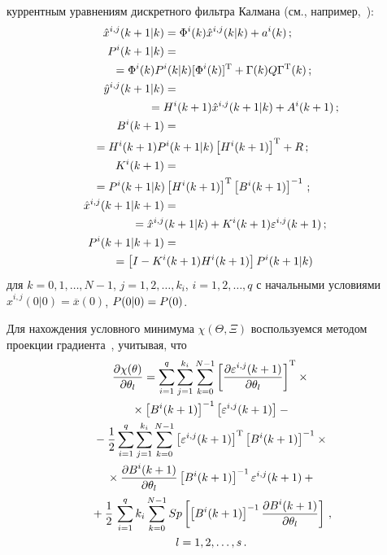 \begin{multicols}{2}
\noindent
куррентным уравнениям дискретного фильтра Калмана (см.,
например,~\cite{16-c}):
\begin{align}
\hat{x}^{i,j}(k+1\vert k) &=\Phi^i(k) \hat{x}^{i,j}(k\vert k)+a^i(k)\,;\notag\\
P^i (k+1\vert k)&={}\notag\\
&\hspace*{-16mm}{}=\Phi^i (k) P^i (k\vert k)[\Phi^i (k) ]^{\mathrm{T}}+
\Gamma(k) Q \Gamma^{\mathrm{T}}(k)\,;\label{e12-c}\\
\hat{y}^{i,j}(k+1\vert k) &={}\notag\\
&\hspace*{-5mm}{}=H^i(k+1) \hat{x}^{i,j}(k+1\vert k)+A^i(k+1)\,;\notag\\
B^i(k+1) &={}\notag\\
&\hspace*{-22mm}{}=H^i(k+1)P^i(k+1\vert k)\left[H^i(k+1)\right]^{\mathrm{T}}+R\,;\label{e13-c}\\
K^i(k+1) & ={}\notag\\
&\hspace*{-22mm}{}= P^i(k+1\vert k) \left[ H^i(k+1)\right]^{\mathrm{T}}\left[B^i(k+1)\right]^{-1}\,;\label{e14-c}\\
\hat{x}^{i,j}(k+1\vert k+1) & ={}\notag\\
&\hspace*{-10mm}{}=\hat{x}^{i,j}(k+1\vert  k)+K^i(k+1)\varepsilon^{i,j}(k+1)\,;\notag\\
P^i(k+1 \vert k+1) &={}\notag\\
&\hspace*{-16mm}{}=\left[ I-K^i(k+1)H^i(k+1)\right] P^i(k+1\vert k)\label{e15-c}
\end{align}
для $k=0, 1, \ldots , N-1$, $j=1, 2, \ldots , k_i$, $i=1, 2, \ldots , q$ с начальными
условиями $\hat{x}^{i,j}(0\vert 0)=\overline{x}(0)$, $P(0\vert 0)\hm=P(0)$.

  Для нахождения условного минимума $\chi(\Theta, \Xi)$ воспользуемся
методом проекции градиента~\cite{17-c, 18-c}, учитывая, что
  \begin{multline*}
  \displaystyle\frac{\displaystyle \partial \chi(\theta)\mathstrut}{\displaystyle \partial \theta_l\mathstrut} = \sum\limits_{i=1}^q
\sum\limits_{j=1}^{k_i}\sum\limits_{k=0}^{N-1} \left[ \displaystyle\frac{\displaystyle \partial
\varepsilon^{i,j}(k+1)\mathstrut}{\displaystyle \partial\theta_l\mathstrut}\right]^{\mathrm{T}} \times{}\\
{}\times \left[ B^i(k+1)\right ]^{-
1}\left[\varepsilon^{i,j}(k+1)\right]-{}\\
  {}- \displaystyle\frac{\displaystyle 1\mathstrut}{\displaystyle 2\mathstrut}\sum\limits_{i=1}^q
\sum\limits_{j=1}^{k_i}\sum\limits_{k=0}^{N-1} \left[
\varepsilon^{i,j}(k+1)\right]^{\mathrm{T}} \left[B^i(k+1)\right]^{-1}\times{}\\
{}\times
\displaystyle\frac{\displaystyle \partial
B^i(k+1)\mathstrut}{\displaystyle \partial\theta_l\mathstrut}\left[ B^i(k+1)\right]^{-1}\varepsilon^{i,j}(k+1)+{}\\
  {}+\displaystyle\frac{\displaystyle 1\mathstrut}{\displaystyle 2\mathstrut}\,\sum\limits_{i=1}^q k_i \sum\limits_{k=0}^{N-1} Sp \left[\left[
B^i(k+1)\right]^{-1}\displaystyle\frac{\displaystyle \partial B^i(k+1)\mathstrut}{\displaystyle \partial\theta_l\mathstrut}\right]\,,\\
 l=1, 2, \ldots ,s\,.
  \end{multline*}
  

\end{multicols}
